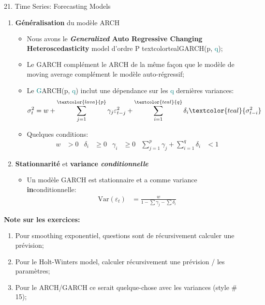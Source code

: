 \documentclass[12pt, titlepage, french]{report}
\begin{document}
\begin{CHPT_SUMM}[label = {timeseries21}]{21. Time Series: Forecasting Models}
\begin{enumerate}
\begin{itemize}
		\end{itemize}
	\item[]	\textbf{Généralisation} du modèle ARCH
		\begin{itemize}
		\item	Nous avons le \textbf{\textit{Generalized} Auto Regressive Changing Heteroscedasticity} model d'ordre P textcolor{teal}{G}ARCH(p, \textcolor{teal}{q});
		\item	Le GARCH complément le ARCH de la même façon que le modèle de moving average complément le modèle auto-régressif;
		\item	Le \textcolor{teal}{G}AR\textcolor{lava}{CH}(\textcolor{lava}{p}, \textcolor{teal}{q}) inclut une dépendance sur les \textcolor{teal}{q} dernières variances:
			\begin{align*}
			\sigma^{2}_{t}	&=	w + \sum_{j = 1}^{\textcolor{lava}{p}} \gamma_{j} \varepsilon_{t - j}^{2} + \sum_{i = 1}^{\textcolor{teal}{q}} \delta_{i} \textcolor{teal}{\sigma^{2}_{t - i}}
			\end{align*}
		\item	Quelques conditions:
			\begin{align*}
			w &> 0	&	
			\delta_{i}	&\ge 0	&
			\gamma_{i} &\ge 0	&
			\sum_{j = 1}^{p} \gamma_{j} + \sum_{i = 1}^{q} \delta_{i} &< 1
			\end{align*}
		\end{itemize}
	\item[]	\textbf{Stationnarité} et \textbf{variance \textit{conditionnelle}}
		\begin{itemize}
		\item	Un modèle GARCH est stationnaire et a comme variance \textbf{in}conditionnelle:
			\begin{align*}
			\text{Var}(\varepsilon_{t})	
			&=	\frac{w}{1 - \sum \gamma_{j} - \sum \delta_{i}}
			\end{align*}
		\end{itemize}
\end{enumerate}

\textbf{Note sur les exercices:} 
\begin{enumerate}
	\item	Pour smoothing exponentiel, questions sont de récursivement calculer une prévision;
	\item	Pour le Holt-Winters model, calculer récursivement une prévision / les paramètres;
	\item	Pour le ARCH/GARCH ce serait quelque-chose avec les variances (style \# 15);
\end{enumerate}
\end{CHPT_SUMM}
\end{document}
